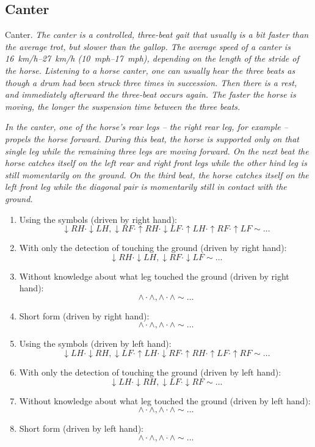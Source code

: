 \subsection{Canter}
\begin{definition}{Canter.}
    \label{def:canter}
    \textit{The canter is a controlled, three-beat gait that usually is a bit faster than the average trot, but slower than the gallop. The average speed of a canter is \SIrange{16}{27}{km/h} (\SIrange{10}{17}{mph}), depending on the length of the stride of the horse. Listening to a horse canter, one can usually hear the three beats as though a drum had been struck three times in succession. Then there is a rest, and immediately afterward the three-beat occurs again. The faster the horse is moving, the longer the suspension time between the three beats.}
    
    \textit{In the canter, one of the horse's rear legs -- the right rear leg, for example -- propels the horse forward. During this beat, the horse is supported only on that single leg while the remaining three legs are moving forward. On the next beat the horse catches itself on the left rear and right front legs while the other hind leg is still momentarily on the ground. On the third beat, the horse catches itself on the left front leg while the diagonal pair is momentarily still in contact with the ground.} \cite{Harrisc1993}
    
    \begin{enumerate}
        \item Using the symbols (driven by right hand):
        $$ \downarrow RH \cdot \downarrow LH, \downarrow RF \cdot \uparrow RH \cdot \downarrow LF \cdot \uparrow LH \cdot \uparrow RF \cdot \uparrow LF \sim \dots $$
        \item With only the detection of touching the ground (driven by right hand):
        $$ \downarrow RH \cdot \downarrow LH, \downarrow RF \cdot \downarrow LF \sim \dots $$
        \item Without knowledge about what leg touched the ground (driven by right hand):
        $$ \wedge \cdot \wedge, \wedge \cdot \wedge \sim \dots $$
        \item Short form (driven by right hand):
        $$ \wedge \cdot \wedge, \wedge \cdot \wedge \sim \dots $$
        \item Using the symbols (driven by left hand):
        $$ \downarrow LH \cdot \downarrow RH, \downarrow LF \cdot \uparrow LH \cdot \downarrow RF \cdot \uparrow RH \cdot \uparrow LF \cdot \uparrow RF \sim \dots $$
        \item With only the detection of touching the ground (driven by left hand):
        $$ \downarrow LH \cdot \downarrow RH, \downarrow LF \cdot \downarrow RF \sim \dots $$
        \item Without knowledge about what leg touched the ground (driven by left hand):
        $$ \wedge \cdot \wedge, \wedge \cdot \wedge \sim \dots $$
        \item Short form (driven by left hand):
        $$ \wedge \cdot \wedge, \wedge \cdot \wedge \sim \dots $$
    \end{enumerate}
\end{definition}

